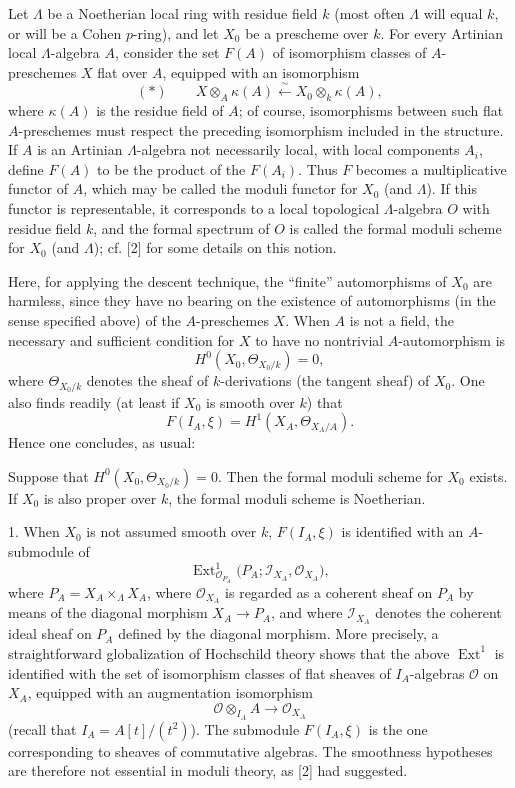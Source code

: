Let $\Lambda$ be a Noetherian local ring with residue field $k$ (most often
$\Lambda$ will equal $k$, or will be a Cohen $p$-ring), and let $X_0$ be a
prescheme over $k$. For every Artinian local $\Lambda$-algebra $A$, consider
the set $F(A)$ of isomorphism classes of $A$-preschemes $X$ flat over $A$,
equipped with an isomorphism
\[
  (*)\qquad
  X\otimes_A\kappa(A)\xleftarrow{\sim}
  X_0\otimes_k\kappa(A),
\]
where $\kappa(A)$ is the residue field of $A$; of course, isomorphisms between
such flat $A$-preschemes must respect the preceding isomorphism included in the
structure. If $A$ is an Artinian $\Lambda$-algebra not necessarily local, with
local components $A_i$, define $F(A)$ to be the product of the $F(A_i)$. Thus
$F$ becomes a multiplicative functor of $A$, which may be called the moduli
functor for $X_0$ (and $\Lambda$). If this functor is representable, it
corresponds to a local topological $\Lambda$-algebra $O$ with residue field
$k$, and the formal spectrum of $O$ is called the formal moduli scheme for
$X_0$ (and $\Lambda$); cf. [2] for some details on this notion.

Here, for applying the descent technique, the “finite” automorphisms of $X_0$
are harmless, since they have no bearing on the existence of automorphisms (in
the sense specified above) of the $A$-preschemes $X$. When $A$ is not a field,
the necessary and sufficient condition for $X$ to have no nontrivial
$A$-automorphism is
\[
  H^0(X_0,\Theta_{X_0/k})=0,
\]
where $\Theta_{X_0/k}$ denotes the sheaf of $k$-derivations (the tangent sheaf)
of $X_0$. One also finds readily (at least if $X_0$ is smooth over $k$) that
\[
  F(I_A,\xi)=H^1(X_A,\Theta_{X_A/A}).
\]
Hence one concludes, as usual:

 Suppose that
$H^0(X_0,\Theta_{X_0/k})=0$. Then the formal moduli scheme for $X_0$ exists. If
$X_0$ is also proper over $k$, the formal moduli scheme is Noetherian.

 1. When $X_0$ is not assumed smooth over $k$,
$F(I_A,\xi)$ is identified with an $A$-submodule of
\[
  \operatorname{Ext}^1_{\mathcal O_{P_A}}
  \bigl(P_A;\mathcal I_{X_A},\mathcal O_{X_A}\bigr),
\]
where $P_A=X_A\times_\Lambda X_A$, where $\mathcal O_{X_A}$ is regarded as a
coherent sheaf on $P_A$ by means of the diagonal morphism
$X_A\longrightarrow P_A$, and where $\mathcal I_{X_A}$ denotes the coherent
ideal sheaf on $P_A$ defined by the diagonal morphism. More precisely, a
straightforward globalization of Hochschild theory shows that the above
$\operatorname{Ext}^1$ is identified with the set of isomorphism classes of
flat sheaves of $I_A$-algebras $\mathcal O$ on $X_A$, equipped with an
augmentation isomorphism
\[
  \mathcal O\otimes_{I_A}A\longrightarrow\mathcal O_{X_A}
\]
(recall that $I_A=A[t]/(t^2)$). The submodule $F(I_A,\xi)$ is the one
corresponding to sheaves of commutative algebras. The smoothness hypotheses are
therefore not essential in moduli theory, as [2] had suggested.


